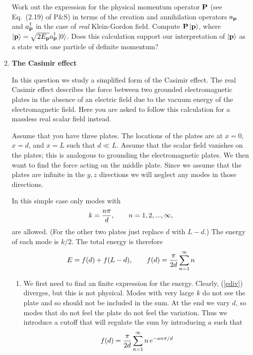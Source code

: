 \begin{enumerate}
  Work out the expression for the physical momentum operator ${\bf P}$
(see Eq.~(2.19) of P\&S) in terms of the creation and annihilation operators 
$a_{\bf p}$ and $a_{\bf p}^\dagger$ in the case of {\em real} Klein-Gordon 
field. Compute ${\bf P}\left|{\bf p}\right>$, where $\left|{\bf p}\right>=
\sqrt{2E_{\bf p}}a_{\bf p}^\dagger \left|0\right>$. Does this calculation 
support our interpretation of $\left|{\bf p}\right>$ as a state with one 
particle of definite momentum?

 \vspace*{0.5cm}

\item {\bf The Casimir effect}

In this question we study a simplified form of the Casimir effect. The real Casimir effect describes the force between two grounded electromagnetic plates in the absence of an electric field due to the vacuum energy of the electromagnetic field. Here you are asked to follow this calculation for a massless real scalar field instead. 

Assume that you have three plates. The locations
of the plates are at $x=0$, $x=d$, and $x=L$ such that $d \ll L$. 
Assume that the scalar field vanishes on the plates; this is analogous to grounding the electromagnetic plates.
We then want to find the force acting on the middle plate. Since we assume that the plates are infinite in the $y,z$ directions we will neglect any modes in those directions. 
 
In this simple case only modes with 
\begin{equation}
k={n \pi \over d}, \qquad n=1,2,...,\infty, 
\end{equation}
are allowed. (For the other two plates just replace $d$ with $L-d$.)  The
 energy of each mode is $k/2$. The total energy is therefore
\begin{equation} \label{ediv}
E=f(d)+f(L-d),\qquad f(d)={\pi \over 2 d} \sum_{n=1}^\infty n
\end{equation}

\begin{enumerate}
\item
We first need to find an finite expression for the energy. Clearly,
(\ref{ediv}) diverges, but this is not physical. Modes with very
large $k$ do not see the plate and so should not be included in the sum.
At the end we vary $d$, so modes that do not feel the plate do not
feel the variation. Thus we introduce a
cutoff that will regulate the sum by introducing $a$ such that 
\begin{equation} \label{fineee}
f(d)={\pi \over 2 d} \sum_{n=1}^\infty n \, e^{-a n \pi/d}
\end{equation}


\end{enumerate}
\end{enumerate}
